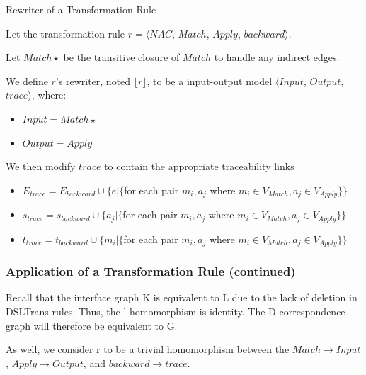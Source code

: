 \begin{definition}{Rewriter of a Transformation Rule\\}
\label{def:rewriter_transformation_rule}

Let the transformation rule $r = \big\langle \mathit{NAC}$, $\mathit{Match}$, $\mathit{Apply}$, $\mathit{backward}\big\rangle$.

Let $\mathit{Match}\star$ be the transitive closure of $\mathit{Match}$ to handle any indirect edges.

We define $r$'s rewriter, noted $\lfloor r \rfloor$, to be a input-output model $\big\langle \mathit{Input}$, $\mathit{Output}$, $\mathit{trace}\big\rangle$, where:

\begin{itemize}
\item $ \mathit{Input} = \mathit{Match\star}$
\item $ \mathit{Output} = \mathit{Apply}$
\end{itemize}

We then modify $\mathit{trace}$ to contain the appropriate traceability links

\begin{itemize}
\item $E_{trace} = E_{backward} \cup \big\{e | \{$for each pair $m_i, a_j$ where $m_i \in V_{Match}, a_j \in V_{Apply}\}\big\}$
\item $s_{trace} = s_{backward} \cup \big\{a_j | \{$for each pair $m_i, a_j$ where $m_i \in V_{Match}, a_j \in V_{Apply}\}\big\}$
\item $t_{trace} = t_{backward} \cup \big\{m_i | \{$for each pair $m_i, a_j$ where $m_i \in V_{Match}, a_j \in V_{Apply}\}\big\}$
\end{itemize}

\end{definition}

\subsubsection*{Application of a Transformation Rule (continued)}

Recall that the interface graph K is equivalent to L due to the lack of deletion in DSLTrans rules. Thus, the l homomorphism is identity. The D correspondence graph will therefore be equivalent to G.


As well, we consider r to be a trivial homomorphism between the $\mathit{Match} \rightarrow \mathit{Input}$, $\mathit{Apply} \rightarrow \mathit{Output}$, and $\mathit{backward} \rightarrow \mathit{trace}$.

